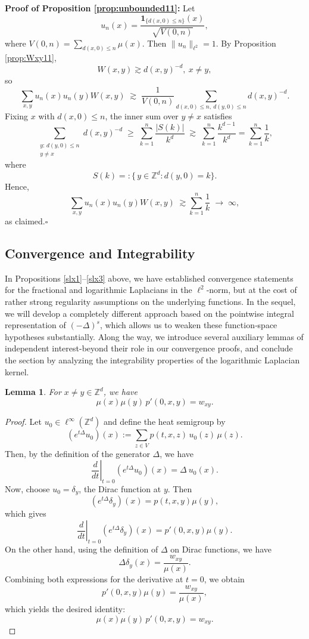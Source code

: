 \documentclass[reqno,12pt]{amsart}
\numberwithin{equation}{section}
\newtheorem{lemma}[theorem]{Lemma}
\begin{document}
	\vspace{1\baselineskip}
	

\noindent \textbf{Proof of Proposition \ref{prop:unbounded11}:}
	Let 
	\[
	u_n(x)
	=\frac{\mathbf{1}_{\{d(x,0)\le n\}}(x)}{\sqrt{V(0,n)}},
	\]
	where \(V(0,n)=\sum_{d(x,0)\le n}\mu(x)\).  Then \(\|u_n\|_{\ell^2}=1\).  By Proposition \ref{prop:Wxy11},
	\[
	W(x,y)\gtrsim d(x,y)^{-d},\:x\ne y,
	\]
	so
	\[
	\sum_{x,y}u_n(x)u_n(y)W(x,y)
	\;\gtrsim\;\frac{1}{V(0,n)}\sum_{d(x,0)\le n,\:d(y,0)\le n}d(x,y)^{-d}.
	\]
	Fixing \(x\) with \(d(x,0)\le n\), the inner sum over \(y\ne x\) satisfies
	\[
	\sum_{\substack{y:\,d(y,0)\le n\\y\ne x}}d(x,y)^{-d}
	\;\ge\;\sum_{k=1}^{n}\frac{|S(k)|}{k^{d}}
	\;\gtrsim\;\sum_{k=1}^{n}\frac{k^{d-1}}{k^d}
	=\sum_{k=1}^n\frac1k,
	\]
	where
	$$
	S(k)=:\{\,y\in\mathbb{Z}^d : d(y,0)=k\}.
	$$
Hence,
	\[
	\sum_{x,y}u_n(x)u_n(y)W(x,y)
	\;\gtrsim \sum_{k=1}^n\frac1k
	\;\longrightarrow\;\infty,
	\]
	as claimed.\hfill $\square$



\subsection{Convergence and Integrability}

In Propositions \ref{slx1}–\ref{slx3} above, we have established convergence statements for the fractional and logarithmic Laplacians in the $\ell^2$‐norm, but at the cost of rather strong regularity assumptions on the underlying functions.  In the sequel, we will develop a completely different approach based on the pointwise integral representation of $(-\Delta)^s$, which allows us to weaken these function‐space hypotheses substantially.  Along the way, we introduce several auxiliary lemmas of independent interest-beyond their role in our convergence proofs, and conclude the section by analyzing the integrability properties of the logarithmic Laplacian kernel.


\begin{lemma}\label{wxy1}
	For $x \neq y \in \mathbb{Z}^d $, we have
	\[
	\mu(x) \mu(y) \, p'(0, x, y) = w_{xy}.
	\]
\end{lemma}

\begin{proof}
	Let $u_0 \in \ell^{\infty}(\mathbb{Z}^d)$ and define the heat semigroup by
	\[
	(e^{t\Delta} u_0)(x) := \sum_{z \in V} p(t, x, z) \, u_0(z) \, \mu(z).
	\]
	Then, by the definition of the generator $\Delta$, we have
	\[
	\left. \frac{d}{dt} \right|_{t=0} (e^{t\Delta} u_0)(x) = \Delta\: u_0(x).
	\]
	Now, choose $u_0 = \delta_y$, the Dirac function at $y$. Then
	\[
	(e^{t\Delta} \delta_y)(x) = p(t, x, y) \mu(y),
	\]
	which gives
	\[
	\left. \frac{d}{dt} \right|_{t=0} (e^{t\Delta} \delta_y)(x) = p'(0, x, y) \mu(y).
	\]
	On the other hand, using the definition of $\Delta$ on Dirac functions, we have
	\[
	\Delta \delta_y(x) = \frac{w_{xy}}{\mu(x)}.
	\]
	Combining both expressions for the derivative at $t = 0$, we obtain
	\[
	p'(0, x, y) \mu(y) = \frac{w_{xy}}{\mu(x)},
	\]
	which yields the desired identity:
	\[
	\mu(x) \mu(y) \, p'(0, x, y) = w_{xy}.
	\]
\end{proof}
\end{document}
